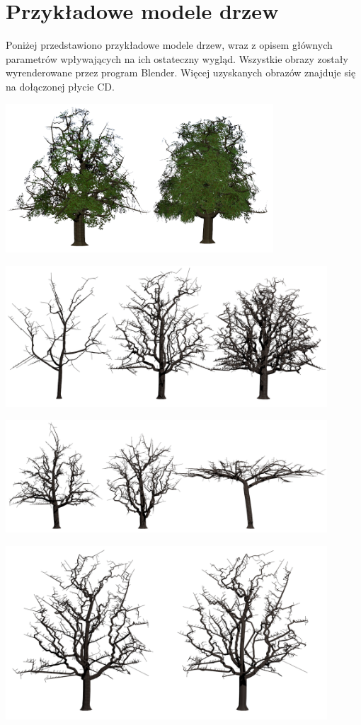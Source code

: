 \section{Przykładowe modele drzew}
Poniżej przedstawiono przykładowe modele drzew, wraz z opisem głównych parametrów wpływających na ich ostateczny wygląd.
Wszystkie obrazy zostały wyrenderowane przez program Blender. Więcej uzyskanych obrazów znajduje się na dołączonej płycie CD.
\begin{center}
	\includegraphics[width=100mm]{images/renders/greentree.png}
\end{center}

\begin{center}
	\includegraphics[width=120mm]{images/renders/points.png}
\end{center}

\begin{center}
	\includegraphics[width=120mm]{images/renders/shape.png}
\end{center}

\begin{center}
	\includegraphics[width=120mm]{images/renders/smooth.png}
\end{center}



